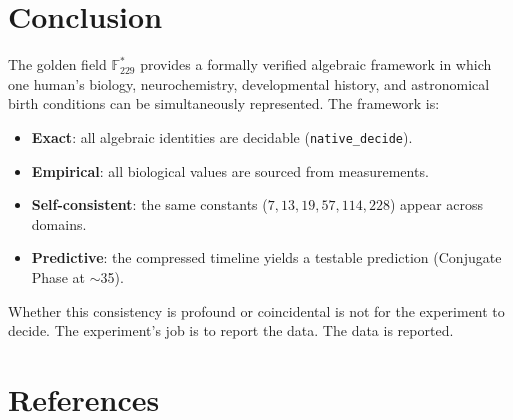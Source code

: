 \documentclass[12pt, letterpaper]{article}
\begin{document}
\section{Conclusion}

The golden field $\mathbb{F}^*_{229}$ provides a formally verified algebraic framework in which one human's biology, neurochemistry, developmental history, and astronomical birth conditions can be simultaneously represented. The framework is:
\begin{itemize}[nosep]
    \item \textbf{Exact}: all algebraic identities are decidable (\texttt{native\_decide}).
    \item \textbf{Empirical}: all biological values are sourced from measurements.
    \item \textbf{Self-consistent}: the same constants ($7, 13, 19, 57, 114, 228$) appear across domains.
    \item \textbf{Predictive}: the compressed timeline yields a testable prediction (Conjugate Phase at $\sim$35).
\end{itemize}

Whether this consistency is profound or coincidental is not for the experiment to decide. The experiment's job is to report the data. The data is reported.

\section*{References}
\end{document}
